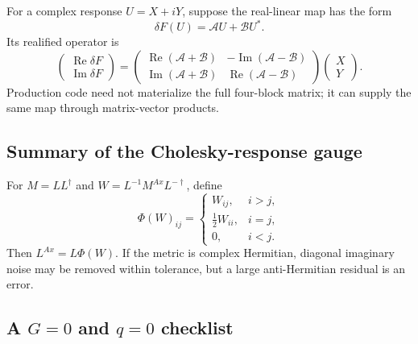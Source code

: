 For a complex response $U=X+iY$, suppose the real-linear map has the form
\begin{equation}
  \delta F(U)=\mathcal A U+\mathcal B U^*.
  \label{eq:appendix-complex-map}
\end{equation}
Its realified operator is
\begin{equation}
  \begin{pmatrix}
    \operatorname{Re}\delta F\\
    \operatorname{Im}\delta F
  \end{pmatrix}
  =
  \begin{pmatrix}
    \operatorname{Re}(\mathcal A+\mathcal B) &
    -\operatorname{Im}(\mathcal A-\mathcal B)\\
    \operatorname{Im}(\mathcal A+\mathcal B) &
    \operatorname{Re}(\mathcal A-\mathcal B)
  \end{pmatrix}
  \begin{pmatrix}X\\Y\end{pmatrix}.
  \label{eq:appendix-real-hessian}
\end{equation}
Production code need not materialize the full four-block matrix; it can supply
the same map through matrix-vector products.

\subsection{Summary of the Cholesky-response gauge}

For $M=LL^\dagger$ and $W=L^{-1}M^{Ax}L^{-\dagger}$, define
\begin{equation}
  \Phi(W)_{ij}
  =\begin{cases}
    W_{ij},&i>j,\\
    \tfrac12W_{ii},&i=j,\\
    0,&i<j.
  \end{cases}
  \label{eq:appendix-cholesky-phi}
\end{equation}
Then $L^{Ax}=L\Phi(W)$.  If the metric is complex Hermitian, diagonal imaginary
noise may be removed within tolerance, but a large anti-Hermitian residual is
an error.

\subsection{A \texorpdfstring{$G=0$ and $q=0$}{G=0 and q=0} checklist}

